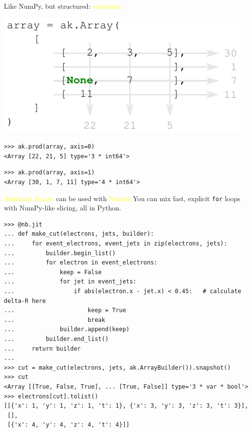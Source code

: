 \documentclass[aspectratio=169]{beamer}
\begin{document}
\begin{frame}[fragile]{Like NumPy, but structured: \textcolor{yellow}{reduction}}
\vspace{0.5 cm}

\includegraphics[width=8 cm]{img/reduction.pdf}

\begin{verbatim}
>>> ak.prod(array, axis=0)
<Array [22, 21, 5] type='3 * int64'>
\end{verbatim}

\begin{verbatim}
>>> ak.prod(array, axis=1)
<Array [30, 1, 7, 11] type='4 * int64'>
\end{verbatim}
\end{frame}

\begin{frame}[fragile]{\textcolor{yellow}{Awkward Arrays} can be used with \textcolor{yellow}{Numba}}
\vspace{0.2 cm}
You can mix fast, explicit \texttt{for} loops with NumPy-like slicing, all in Python.

\vspace{0.25 cm}
\scriptsize
\begin{verbatim}
>>> @nb.jit
... def make_cut(electrons, jets, builder):
...     for event_electrons, event_jets in zip(electrons, jets):
...         builder.begin_list()
...         for electron in event_electrons:
...             keep = False
...             for jet in event_jets:
...                 if abs(electron.x - jet.x) < 0.45:   # calculate delta-R here
...                     keep = True
...                     break
...             builder.append(keep)
...         builder.end_list()
...     return builder
... 
>>> cut = make_cut(electrons, jets, ak.ArrayBuilder()).snapshot()
>>> cut
<Array [[True, False, True], ... [True, False]] type='3 * var * bool'>
>>> electrons[cut].tolist()
[[{'x': 1, 'y': 1, 'z': 1, 't': 1}, {'x': 3, 'y': 3, 'z': 3, 't': 3}],
 [],
 [{'x': 4, 'y': 4, 'z': 4, 't': 4}]]
\end{verbatim}
\end{frame}
\end{document}
